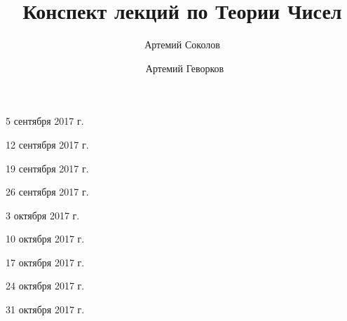 \documentclass[%
  a4paper,%
  titlepage,%
  11pt%
]{article}%
\title{Конспект лекций по Теории Чисел}
\author{Артемий Соколов \and~Артемий Геворков}
\begin{document}
    
    
    \tableofcontents

    \pagestyle{fancy}

    \begin{lecture}{5 сентября 2017 г.}
        
    \end{lecture}

    \begin{lecture}{12 сентября 2017 г.}
        
    \end{lecture}

    \begin{lecture}{19 сентября 2017 г.}
        
    \end{lecture}

    \begin{lecture}{26 сентября 2017 г.}
        
    \end{lecture}

    \begin{lecture}{3 октября 2017 г.}
        
    \end{lecture}

    \begin{lecture}{10 октября 2017 г.}
        
    \end{lecture}

    \begin{lecture}{17 октября 2017 г.}
        
    \end{lecture}

    \begin{lecture}{24 октября 2017 г.}
        
    \end{lecture}

    \begin{lecture}{31 октября 2017 г.}
        
    \end{lecture}
\end{document}

